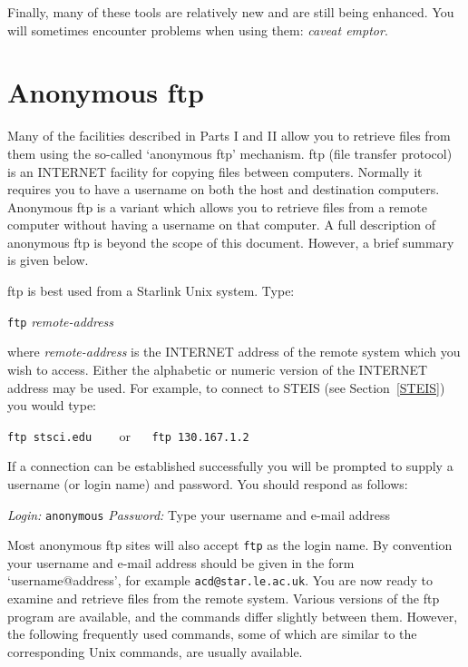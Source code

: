 \documentclass[twoside,11pt,nolof]{starlink}
\begin{document}
Finally, many of these tools are relatively new and are still being
enhanced. You will sometimes encounter problems when using them: \textit{caveat emptor}.


\section{Anonymous ftp
\label{ANON_FTP}}

Many of the facilities described in Parts I and II allow you to retrieve
files from them using the so-called `anonymous ftp' mechanism. ftp
(file transfer protocol) is an INTERNET facility for copying files
between computers. Normally it requires you to have a username on
both the host and destination computers. Anonymous ftp is a variant
which allows you to retrieve files from a remote computer without having
a username on that computer. A full description of anonymous ftp is
beyond the scope of this document. However, a brief summary is given
below.

ftp is best used from a Starlink Unix system. Type:

\vspace{2.0 mm}
\texttt{ftp} \textit{remote-address}
\vspace{2.0 mm}

where \textit{remote-address} is the INTERNET address of the remote system
which you wish to access. Either the alphabetic or numeric version of
the INTERNET address may be used. For example, to connect to STEIS (see
Section~\ref{STEIS}) you would type:

\vspace{2.0 mm}
\verb:ftp stsci.edu : ~~ or ~~ \verb:ftp 130.167.1.2:
\vspace{2.0 mm}

If a connection can be established successfully you will be prompted to
supply a username (or login name) and password. You should respond as
follows:

\textit{Login:} \verb-anonymous-
\newline \textit{Password:} Type your username and e-mail address

Most anonymous ftp sites will also accept \texttt{ftp} as the login name.
By convention your username and e-mail address should be given in the
form `username@address', for example
\newline \texttt{acd@star.le.ac.uk}. You are
now ready to examine and retrieve files from the remote system. Various
versions of the ftp program are available, and the commands differ
slightly between them. However, the following frequently used commands,
some of which are similar to the corresponding Unix commands, are
usually available.
\end{document}
